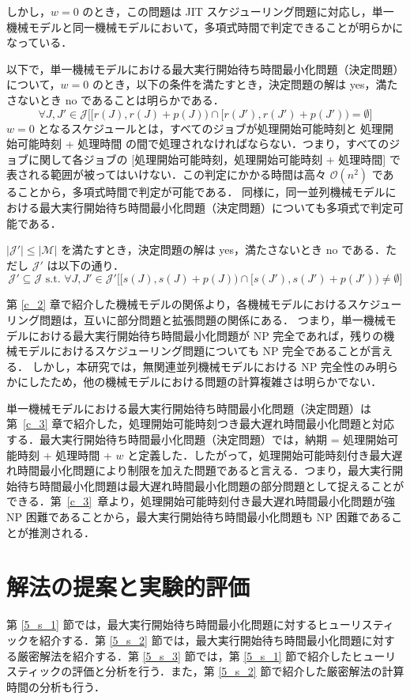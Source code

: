 \documentclass[12pt]{optlab-bachelor}
\begin{document}
しかし，$w = 0$ のとき，この問題は JIT スケジューリング問題に対応し，単一機械モデルと同一機械モデルにおいて，多項式時間で判定できることが明らかになっている．

以下で，単一機械モデルにおける最大実行開始待ち時間最小化問題（決定問題）について，$w = 0$ のとき，以下の条件を満たすとき，決定問題の解は yes，満たさないとき no であることは明らかである．
$$\forall J,J' \in \mathcal{J}\bigg[\big[r(J),r(J) + p(J)\big) \cap \big[r(J'),r(J') + p(J')\big) = \emptyset\bigg]$$
$w = 0$ となるスケジュールとは，すべてのジョブが処理開始可能時刻と 処理開始可能時刻 + 処理時間 の間で処理されなければならない．つまり，すべてのジョブに関して各ジョブの [処理開始可能時刻，処理開始可能時刻 + 処理時間] で表される範囲が被ってはいけない．この判定にかかる時間は高々 $\mathcal{O}(n^2)$ であることから，多項式時間で判定が可能である．
同様に，同一並列機械モデルにおける最大実行開始待ち時間最小化問題（決定問題）についても多項式で判定可能である．

$|\mathcal{J}'| \le |\mathcal{M}|$ を満たすとき，決定問題の解は yes，満たさないとき no である．ただし $\mathcal{J}'$ は以下の通り．
$$\mathcal{J}' \subseteq \mathcal{J} \text{ s.t. }\forall J,J' \in \mathcal{J}'\big[[s(J),s(J) + p(J)) \cap [s(J'),s(J') + p(J')) \neq \emptyset\big]$$

第 \ref{c_2} 章で紹介した機械モデルの関係より，各機械モデルにおけるスケジューリング問題は，互いに部分問題と拡張問題の関係にある．
つまり，単一機械モデルにおける最大実行開始待ち時間最小化問題が NP 完全であれば，残りの機械モデルにおけるスケジューリング問題についても NP 完全であることが言える．
しかし，本研究では，無関連並列機械モデルにおける NP 完全性のみ明らかにしたため，他の機械モデルにおける問題の計算複雑さは明らかでない．

単一機械モデルにおける最大実行開始待ち時間最小化問題（決定問題）は第~\ref{c_3} 章で紹介した，処理開始可能時刻つき最大遅れ時間最小化問題と対応する．最大実行開始待ち時間最小化問題（決定問題）では，納期 = 処理開始可能時刻 + 処理時間 + $w$ と定義した．したがって，処理開始可能時刻付き最大遅れ時間最小化問題により制限を加えた問題であると言える．つまり，最大実行開始待ち時間最小化問題は最大遅れ時間最小化問題の部分問題として捉えることができる．第~\ref{c_3}~章より，処理開始可能時刻付き最大遅れ時間最小化問題が強 NP 困難であることから，最大実行開始待ち時間最小化問題も NP 困難であることが推測される．

\chapter{解法の提案と実験的評価}\label{c_5}
第 \ref{5_s_1} 節では，最大実行開始待ち時間最小化問題に対するヒューリスティックを紹介する．第 \ref{5_s_2} 節では，最大実行開始待ち時間最小化問題に対する厳密解法を紹介する．第 \ref{5_s_3} 節では，第 \ref{5_s_1} 節で紹介したヒューリスティックの評価と分析を行う．また，第 \ref{5_s_2} 節で紹介した厳密解法の計算時間の分析も行う．
\end{document}
